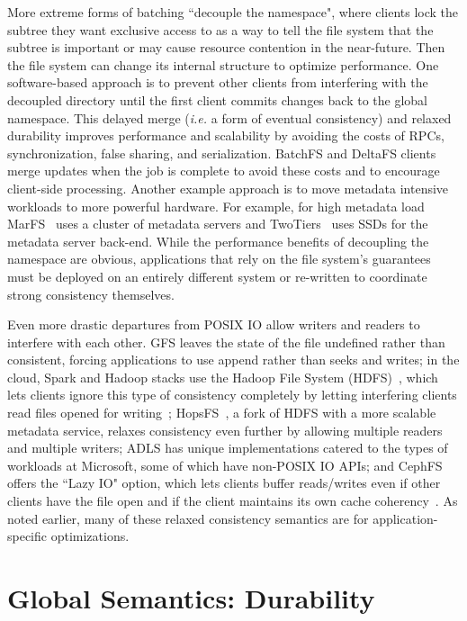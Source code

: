 More extreme forms of batching ``decouple the namespace", where clients lock
the subtree they want exclusive access to as a way to tell the file system that
the subtree is important or may cause resource contention in the near-future.
Then the file system can change its internal structure to optimize performance.
One software-based approach is to prevent other clients from interfering with
the decoupled directory until the first client commits changes back to the
global namespace. This delayed merge ({\it i.e.} a form of eventual
consistency) and relaxed durability improves performance and scalability by
avoiding the costs of RPCs, synchronization, false sharing, and serialization.
BatchFS and DeltaFS clients merge updates when the job is complete to avoid
these costs and to encourage client-side processing. Another example approach
is to move metadata intensive workloads to more powerful hardware. For example,
for high metadata load MarFS~\cite{grider:pdsw2015-marfs} uses a cluster of
metadata servers and TwoTiers~\cite{bent:slides-twotiers} uses SSDs for the
metadata server back-end.  While the performance benefits of decoupling the
namespace are obvious, applications that rely on the file system's guarantees
must be deployed on an entirely different system or re-written to coordinate
strong consistency themselves.  

Even more drastic departures from POSIX IO allow writers and readers to
interfere with each other. GFS leaves the state of the file undefined rather
than consistent, forcing applications to use append rather than seeks and
writes; in the cloud, Spark and Hadoop stacks use the Hadoop File System
(HDFS)~\cite{shvachko:msst10}, which lets clients ignore this type of
consistency completely by letting interfering clients read files opened for
writing~\cite{hakimzadeh:dais14-hdfs-consistency};
HopsFS~\cite{niaza:fast17-hopsfs}, a fork of HDFS with a more scalable metadata
service, relaxes consistency even further by allowing multiple readers and
multiple writers; ADLS has unique implementations catered to the types of
workloads at Microsoft, some of which have non-POSIX IO APIs; and CephFS offers
the ``Lazy IO" option, which lets clients buffer reads/writes even if other
clients have the file open and if the client maintains its own cache
coherency~\cite{docs:cephcaps}. As noted earlier, many of these relaxed
consistency semantics are for application-specific optimizations.

\section{Global Semantics: Durability}

